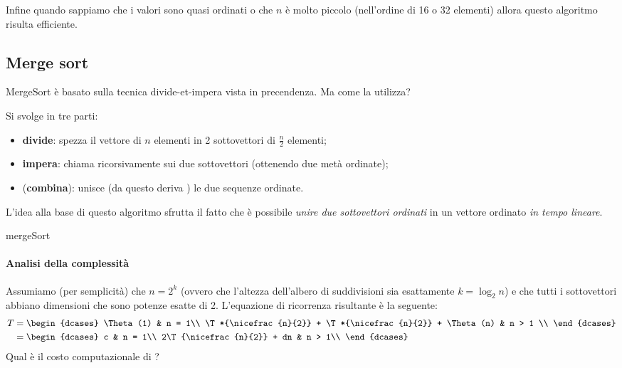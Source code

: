 Infine quando sappiamo che i valori sono quasi ordinati o che \(n\) è molto piccolo (nell'ordine di 16 o 32 elementi) allora questo algoritmo risulta efficiente.

\clearpage
\subsection{Merge sort}

MergeSort è basato sulla tecnica divide-et-impera vista in precendenza.
Ma come la utilizza?

\begin{definition}
Si svolge in tre parti:
\begin{itemize}
	\item \textbf{divide}: spezza il vettore di \(n\) elementi in 2 sottovettori di \(\frac n 2\) elementi;
	\item \textbf{impera}: chiama \mergeSort ricorsivamente sui due sottovettori (ottenendo due metà ordinate);
	\item (\textbf{combina}): unisce (da questo deriva ) le due sequenze ordinate.
\end{itemize}
\end{definition}

L'idea alla base di questo algoritmo sfrutta il fatto che è possibile \emph{unire due sottovettori ordinati} in un vettore ordinato \emph{in tempo lineare}.

\begin{algorithm}[H]
	\caption{mergeSort}
	
	
\end{algorithm}


\clearpage
\paragraph{Analisi della complessità}
Assumiamo (per semplicità) che \(n = 2^k\) (ovvero che l'altezza dell'albero di suddivisioni sia esattamente \(k = \log_2 n\)) e che tutti i sottovettori abbiano dimensioni che sono potenze esatte di 2.
L'equazione di ricorrenza risultante è la seguente:
\begin{align*}
	T &=
	\begin{dcases}
		\Theta(1) & n = 1\\
		\T*{\nicefrac{n}{2}} + \T*{\nicefrac{n}{2}} + \Theta(n) & n > 1 \\
	\end{dcases}\\
	&=
	\begin{dcases}
		c & n = 1\\
		2\T{\nicefrac{n}{2}} + dn & n > 1\\
	\end{dcases}\\
\end{align*}
Qual è il costo computazionale di \mergeSort?

